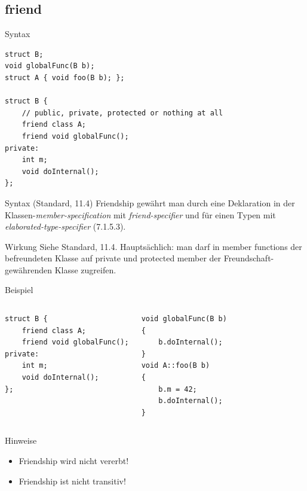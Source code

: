 




\subsection{friend}

\begin{frame}[fragile]{Syntax}
	\begin{lstlisting}
struct B;
void globalFunc(B b);
struct A { void foo(B b); };

struct B {
    // public, private, protected or nothing at all
    friend class A;
    friend void globalFunc();
private:
    int m;
    void doInternal();
};
	\end{lstlisting}
	
	\pause
	
	\begin{block}{Syntax (Standard, 11.4)}
		Friendship gewährt man durch eine Deklaration in der Klassen-\emph{member-specification} mit \emph{friend-specifier} und für einen Typen mit \emph{elaborated-type-specifier} (7.1.5.3).
	\end{block}
\end{frame}


\begin{frame}[fragile]{Wirkung}
	Siehe Standard, 11.4.
	Hauptsächlich: man darf in member functions der befreundeten Klasse auf private und protected member der Freundschaft-gewährenden Klasse zugreifen.
	
	\begin{block}{Beispiel}
		\begin{columns}[t]
			\begin{lstlisting}
struct B {
    friend class A;
    friend void globalFunc();
private:
    int m;
    void doInternal();
};
			\end{lstlisting}
			
			\begin{lstlisting}
void globalFunc(B b)
{
    b.doInternal();
}
void A::foo(B b)
{
    b.m = 42;
    b.doInternal();
}
			\end{lstlisting}
		\end{columns}
	\end{block}
\end{frame}


\begin{frame}{Hinweise}
	\begin{itemize}
		\item Friendship wird nicht vererbt!
		\item Friendship ist nicht transitiv!
	\end{itemize}
\end{frame}
